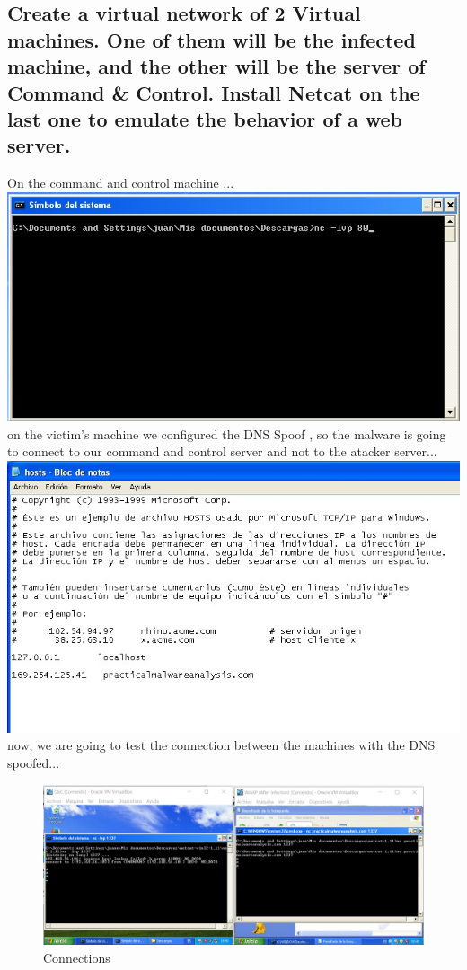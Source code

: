 \documentclass[12pt,letter]{article} %
\begin{document}
        \subsection{ Create a virtual network of 2 Virtual machines. One of
        them will be the infected machine, and the other will be the server of
        Command \& Control. Install Netcat on the last one to emulate the behavior
        of a web server.}
        On the command and control machine ...
        \\ \includegraphics[width=0.5\linewidth]{ncliste.jpeg}
        \\
        on the victim's machine we configured the DNS Spoof , so the malware is
        going to connect to our command and control server and not to the atacker server...
        \\ \includegraphics[width=0.5\linewidth]{ncvictim.jpeg}
        \\
        now, we are going to test the connection between the machines with the
        DNS spoofed...
        \\
        \begin{figure}[h!]
            \centering
            \includegraphics[width=0.8\linewidth]{connections.jpeg}
            \caption{Connections}
            \label{fig:connections}
        \end{figure}
\end{document}
